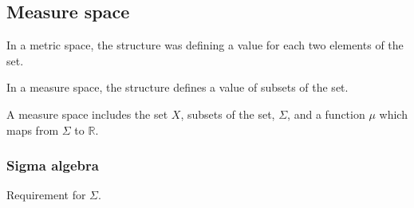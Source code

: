 
\subsection{Measure space}

In a metric space, the structure was defining a value for each two elements of the set.

In a measure space, the structure defines a value of subsets of the set.

A measure space includes the set \(X\), subsets of the set, \(\Sigma \), and a function \(\mu \) which maps from \(\Sigma \) to \(\mathbb{R}\).

\subsubsection{Sigma algebra}

Requirement for \(\Sigma \).

